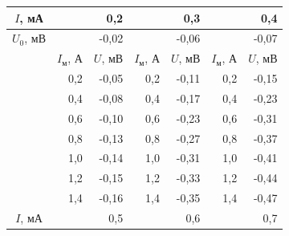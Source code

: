 \begin{longtable}[c]{l|rr|rr|rr|}
		\hline
		\multicolumn{1}{|c|}{$I$, мА}   & \multicolumn{2}{r|}{0,2}                      & \multicolumn{2}{r|}{0,3}                      & \multicolumn{2}{r|}{0,4}                      \\ \hline
		\multicolumn{1}{|c|}{$U_0$, мВ} & \multicolumn{2}{r|}{-0,02}                    & \multicolumn{2}{r|}{-0,06}                    & \multicolumn{2}{r|}{-0,07}                    \\ \hline
		\multicolumn{1}{r|}{}           & \multicolumn{1}{r|}{$I_\text{м}$, А} & $U$, мВ & \multicolumn{1}{c|}{$I_\text{м}$, А} & $U$, мВ & \multicolumn{1}{c|}{$I_\text{м}$, А} & $U$, мВ \\ \cline{2-7} 
		\multicolumn{1}{r|}{}           & \multicolumn{1}{r|}{0,2}            & -0,05  & \multicolumn{1}{r|}{0,2}            & -0,11  & \multicolumn{1}{r|}{0,2}            & -0,15  \\ \cline{2-7} 
		\multicolumn{1}{r|}{}           & \multicolumn{1}{r|}{0,4}            & -0,08  & \multicolumn{1}{r|}{0,4}            & -0,17  & \multicolumn{1}{r|}{0,4}            & -0,23  \\ \cline{2-7} 
		\multicolumn{1}{r|}{}           & \multicolumn{1}{r|}{0,6}            & -0,10  & \multicolumn{1}{r|}{0,6}            & -0,23  & \multicolumn{1}{r|}{0,6}            & -0,31  \\ \cline{2-7} 
		\multicolumn{1}{r|}{}           & \multicolumn{1}{r|}{0,8}            & -0,13  & \multicolumn{1}{r|}{0,8}            & -0,27  & \multicolumn{1}{r|}{0,8}            & -0,37  \\ \cline{2-7} 
		\multicolumn{1}{r|}{}           & \multicolumn{1}{r|}{1,0}            & -0,14  & \multicolumn{1}{r|}{1,0}            & -0,31  & \multicolumn{1}{r|}{1,0}            & -0,41  \\ \cline{2-7} 
		\multicolumn{1}{r|}{}           & \multicolumn{1}{r|}{1,2}            & -0,15  & \multicolumn{1}{r|}{1,2}            & -0,33  & \multicolumn{1}{r|}{1,2}            & -0,44  \\ \cline{2-7} 
		\multicolumn{1}{r|}{}           & \multicolumn{1}{r|}{1,4}            & -0,16  & \multicolumn{1}{r|}{1,4}            & -0,35  & \multicolumn{1}{r|}{1,4}            & -0,47  \\ \hline
		\multicolumn{1}{|c|}{$I$, мА}   & \multicolumn{2}{r|}{0,5}                      & \multicolumn{2}{r|}{0,6}                      & \multicolumn{2}{r|}{0,7}                      \\ \hline

\end{longtable}
